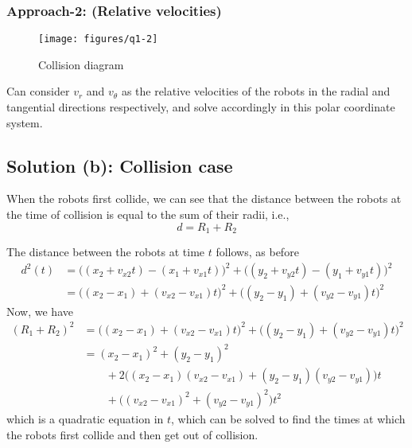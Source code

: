 \vspace*{-1em}
\subsubsection*{Approach-2: (Relative velocities)}

\vspace*{-3em}
\begin{figure}[htbp]
    \centering
    \texttt{[image: figures/q1-2]}
    \vspace*{-2em}
    \caption{
        Collision diagram
    }\label{fig:q1-2}
\end{figure}

Can consider \( v_r \) and \( v_\theta \) as the relative velocities of the robots in the radial and tangential directions respectively, and solve accordingly in this polar coordinate system.

\vspace*{-1em}
\subsection*{Solution (b): Collision case}

When the robots first collide, we can see that the distance between the robots at the time of collision is equal to the sum of their radii, i.e.,
\begin{equation*}
    \boxed{ d = R_1 + R_2 }
\end{equation*}

The distance between the robots at time \( t \) follows, as before
\begin{align*}
    d^2(t)
     & =
    \big((x_2 + v_{x2}t) - (x_1 + v_{x1}t)\big)^2 + \big((y_2 + v_{y2}t) - (y_1 + v_{y1}t)\big)^2
    \\ & =
    \big((x_2 - x_1) + (v_{x2} - v_{x1})t\big)^2 + \big((y_2 - y_1) + (v_{y2} - v_{y1})t\big)^2
\end{align*}
Now, we have
\begin{align*}
    (R_1 + R_2)^2
     & =
    \big((x_2 - x_1) + (v_{x2} - v_{x1})t\big)^2 + \big((y_2 - y_1) + (v_{y2} - v_{y1})t\big)^2
    \\ & =
    (x_2 - x_1)^2 + (y_2 - y_1)^2
    \\ & \qquad
    + 2\big((x_2 - x_1)(v_{x2} - v_{x1}) + (y_2 - y_1)(v_{y2} - v_{y1})\big)t
    \\ & \qquad
    + \big((v_{x2} - v_{x1})^2 + (v_{y2} - v_{y1})^2\big)t^2
\end{align*}
which is a quadratic equation in \( t \), which can be solved to find the times at which the robots first collide and then get out of collision.

